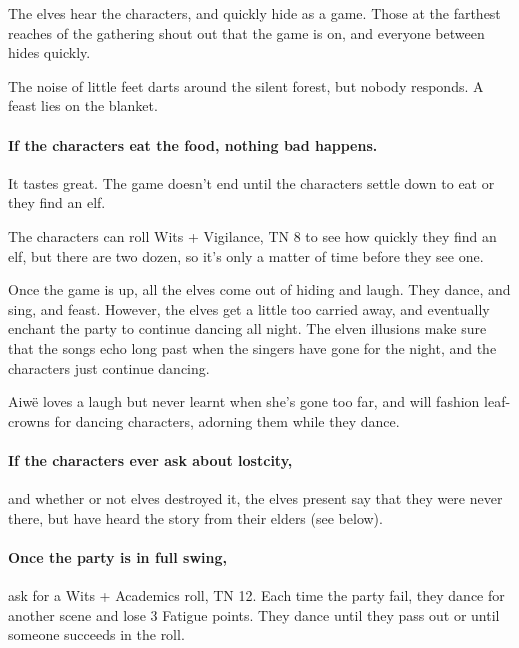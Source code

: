 \begin{multicols}{2}
The elves hear the characters, and quickly hide as a game.  Those at the farthest reaches of the gathering shout out that the game is on, and everyone between hides quickly.

\begin{boxtext}

  The noise of little feet darts around the silent forest, but nobody responds.
  A feast lies on the blanket.

\end{boxtext}

\paragraph{If the characters eat the food, nothing bad happens.}
It tastes great.
The game doesn't end until the characters settle down to eat or they find an elf.

The characters can roll Wits + Vigilance, TN 8 to see how quickly they find an elf, but there are two dozen, so it's only a matter of time before they see one.

Once the game is up, all the elves come out of hiding and laugh.  They dance, and sing, and feast.  However, the elves get a little too carried away, and eventually enchant the party to continue dancing all night.  The elven illusions make sure that the songs echo long past when the singers have gone for the night, and the characters just continue dancing.
 

Aiw\"{e} loves a laugh but never learnt when she's gone too far, and will fashion leaf-crowns for dancing characters, adorning them while they dance.



\paragraph{If the characters ever ask about \gls{lostcity},}
and whether or not elves destroyed it, the elves present say that they were never there, but have heard the story from their elders (see below).

\paragraph{Once the party is in full swing,}
ask for a Wits + Academics roll, TN 12.
Each time the party fail, they dance for another scene and lose 3 Fatigue points.
They dance until they pass out or until someone succeeds in the roll.


\end{multicols}

